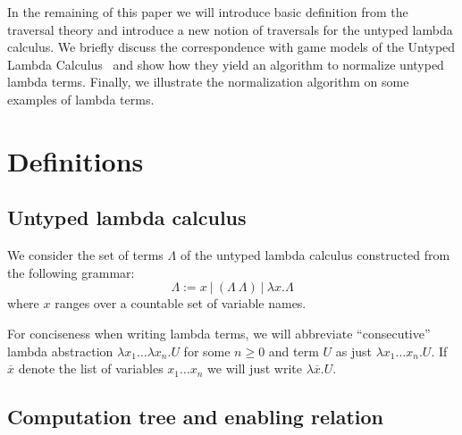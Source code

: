 \documentclass{article}
\theoremstyle{plain}
\theoremstyle{definition}
\theoremstyle{remark}
\begin{document}
In the remaining of this paper we will introduce basic definition from the traversal theory and introduce a new notion of traversals for the untyped lambda calculus. We briefly discuss the correspondence with game models of the Untyped Lambda Calculus~\cite{KerThesis} and show how they yield an algorithm to normalize untyped lambda terms. Finally, we illustrate the normalization algorithm on some examples of lambda terms.

\section{Definitions}

\subsection{Untyped lambda calculus}

We consider the set of terms $\Lambda$ of the untyped lambda calculus constructed from the following grammar:
$$\Lambda := x\ |\ (\Lambda\ \Lambda)\ |\ \lambda x. \Lambda $$
where $x$ ranges over a countable set of variable names.

For conciseness when writing lambda terms, we will abbreviate ``consecutive'' lambda abstraction $\lambda x_1 \ldots \lambda x_n . U$ for some $n\geq 0$ and term $U$ as just
$\lambda x_1 \ldots x_n . U$. If $\overline{x}$ denote the list of variables $x_1 \ldots x_n$ we will just write $\lambda \overline{x} . U$.

\subsection{Computation tree and enabling relation}
\end{document}
